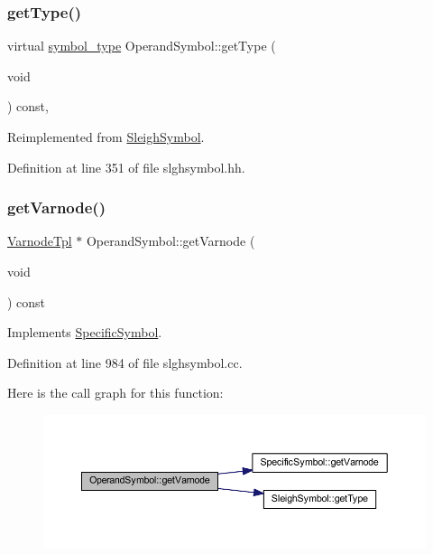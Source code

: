 \subsubsection{\texorpdfstring{getType()}{getType()}}
{\footnotesize\ttfamily virtual \mbox{\hyperlink{class_sleigh_symbol_aba70f7f332fd63488c5ec4bd7807db41}{symbol\+\_\+type}} Operand\+Symbol\+::get\+Type (\begin{DoxyParamCaption}\item[{void}]{ }\end{DoxyParamCaption}) const\hspace{0.3cm}{\ttfamily [inline]}, {\ttfamily [virtual]}}



Reimplemented from \mbox{\hyperlink{class_sleigh_symbol_a2f6e5903e461084c29f95ea024883950}{Sleigh\+Symbol}}.



Definition at line 351 of file slghsymbol.\+hh.

\mbox{\label{class_operand_symbol_a62fb73d10c92f1dd39977abe47f557d2}} 
\subsubsection{\texorpdfstring{getVarnode()}{getVarnode()}}
{\footnotesize\ttfamily \mbox{\hyperlink{class_varnode_tpl}{Varnode\+Tpl}} $\ast$ Operand\+Symbol\+::get\+Varnode (\begin{DoxyParamCaption}\item[{void}]{ }\end{DoxyParamCaption}) const\hspace{0.3cm}{\ttfamily [virtual]}}



Implements \mbox{\hyperlink{class_specific_symbol_abbde46a1f6af6c373420773d45e1e4e2}{Specific\+Symbol}}.



Definition at line 984 of file slghsymbol.\+cc.

Here is the call graph for this function\+:
\nopagebreak
\begin{figure}[H]
\begin{center}
\leavevmode
\includegraphics[width=350pt]{class_operand_symbol_a62fb73d10c92f1dd39977abe47f557d2_cgraph}
\end{center}
\end{figure}
\mbox{\label{class_operand_symbol_afceafc766167e655252176850067b48b}} 
